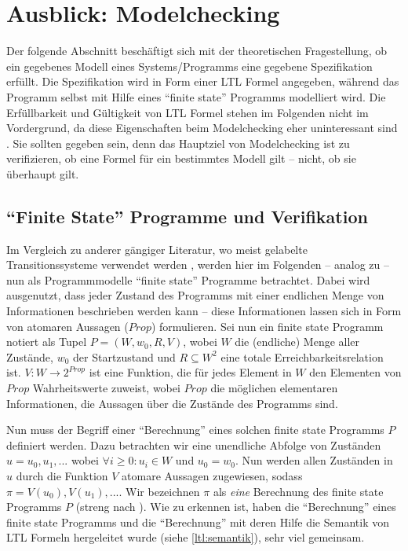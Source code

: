 \section{Ausblick: Modelchecking}

Der folgende Abschnitt beschäftigt sich mit der theoretischen Fragestellung, ob ein gegebenes Modell eines Systems/Programms eine gegebene Spezifikation erfüllt. Die Spezifikation wird in Form einer LTL Formel angegeben, während das Programm selbst mit Hilfe eines "`finite state"' Programms modelliert wird. Die Erfüllbarkeit und Gültigkeit von LTL Formel stehen im Folgenden nicht im Vordergrund, da diese Eigenschaften beim Modelchecking eher uninteressant sind \cite{vardi+96}. Sie sollten gegeben sein, denn das Hauptziel von Modelchecking ist zu verifizieren, ob eine Formel für ein bestimmtes Modell gilt -- nicht, ob sie überhaupt gilt. 

\subsection{"`Finite State"' Programme und Verifikation}

Im Vergleich zu anderer gängiger Literatur, wo meist gelabelte Transitionssysteme verwendet werden \cite{huth+04}, werden hier im Folgenden -- analog zu \cite{vardi+96} -- nun als Programmmodelle "`finite state"' Programme betrachtet. Dabei wird ausgenutzt, dass jeder Zustand des Programms mit einer endlichen Menge von Informationen beschrieben werden kann -- diese Informationen lassen sich in Form von atomaren Aussagen ($Prop$) formulieren. Sei nun ein finite state Programm notiert als Tupel $P = (W, w_0, R, V)$, wobei $W$ die (endliche) Menge aller Zustände, $w_0$ der Startzustand und $R \subseteq W^2$ eine totale Erreichbarkeitsrelation ist. $V: W \rightarrow 2^{Prop}$ ist eine Funktion, die für jedes Element in $W$ den Elementen von $Prop$ Wahrheitswerte zuweist, wobei $Prop$ die möglichen elementaren Informationen, die Aussagen über die Zustände des Programms sind.

Nun muss der Begriff einer "`Berechnung"' eines solchen finite state Programms $P$ definiert werden. Dazu betrachten wir eine unendliche Abfolge von Zuständen $u = u_0, u_1, ... $ wobei $\forall i \geq 0: u_i \in W$ und $u_0 = w_0$. Nun werden allen Zuständen in $u$ durch die Funktion $V$ atomare Aussagen zugewiesen, sodass $\pi = V(u_0), V(u_1), ...$. Wir bezeichnen $\pi$ als \textit{eine} Berechnung des finite state Programms $P$ (streng nach \cite{vardi+96}). Wie zu erkennen ist, haben die "`Berechnung"' eines finite state Programms und die "`Berechnung"' mit deren Hilfe die Semantik von LTL Formeln hergeleitet wurde (siehe \ref{ltl:semantik}), sehr viel gemeinsam. 

